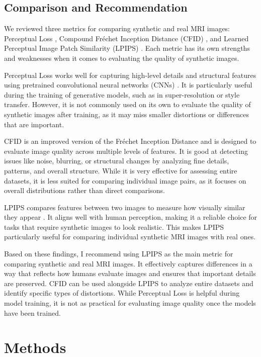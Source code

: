 \documentclass[a4paper,12pt]{article}
\begin{document}
\subsection{Comparison and Recommendation}
We reviewed three metrics for comparing synthetic and real MRI images: Perceptual Loss \cite{johnson_perceptual_2016}, Compound Fréchet Inception Distance (CFID) \cite{nunn_compound_nodate}, and Learned Perceptual Image Patch Similarity (LPIPS) \cite{zhang_unreasonable_2018}. Each metric has its own strengths and weaknesses when it comes to evaluating the quality of synthetic images.

Perceptual Loss works well for capturing high-level details and structural features using pretrained convolutional neural networks (CNNs) . It is particularly useful during the training of generative models, such as in super-resolution or style transfer. However, it is not commonly used on its own to evaluate the quality of synthetic images after training, as it may miss smaller distortions or differences that are important.

CFID is an improved version of the Fréchet Inception Distance and is designed to evaluate image quality across multiple levels of features. It is good at detecting issues like noise, blurring, or structural changes by analyzing fine details, patterns, and overall structure. While it is very effective for assessing entire datasets, it is less suited for comparing individual image pairs, as it focuses on overall distributions rather than direct comparisons.

LPIPS compares features between two images to measure how visually similar they appear . It aligns well with human perception, making it a reliable choice for tasks that require synthetic images to look realistic. This makes LPIPS particularly useful for comparing individual synthetic MRI images with real ones.

Based on these findings, I recommend using LPIPS as the main metric for comparing synthetic and real MRI images. It effectively captures differences in a way that reflects how humans evaluate images and ensures that important details are preserved. CFID can be used alongside LPIPS to analyze entire datasets and identify specific types of distortions. While Perceptual Loss is helpful during model training, it is not as practical for evaluating image quality once the models have been trained.

\section{Methods}
\end{document}
